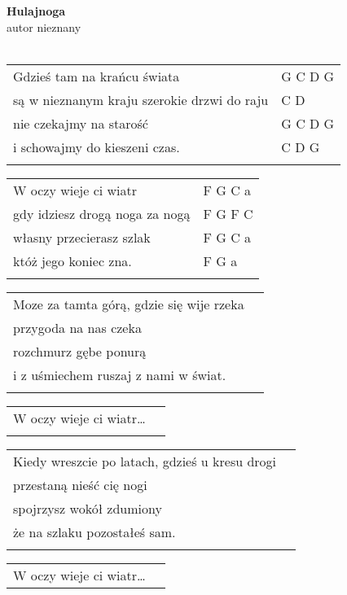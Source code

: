 \documentclass[a5paper]{article}
\begin{document}


\noindent
\fontsize{12pt}{15pt}\selectfont
\textbf{Hulajnoga} \\
\fontsize{8pt}{10pt}\selectfont
autor nieznany \\ \\
\fontsize{10pt}{12pt}\selectfont
{}
\begin{tabular}{@{}p{8.50cm}p{3cm}@{}}
\noindent
Gdzieś tam na krańcu świata & G C D G \\
są w nieznanym kraju szerokie drzwi do raju & C D \\
nie czekajmy na starość & G C D G \\
i schowajmy do kieszeni czas. & C D G \\ \\
\end{tabular}

\noindent
\begin{tabular}{@{}p{7.50cm}p{3cm}@{}}
W oczy wieje ci wiatr & F G C a \\
gdy idziesz drogą noga za nogą & F G F C \\
własny przecierasz szlak & F G C a \\
któż jego koniec zna. & F G a \\ \\
\end{tabular}

\noindent
\begin{tabular}{@{}p{7.50cm}p{3cm}@{}}
Moze za tamta górą, gdzie się wije rzeka \\
przygoda na nas czeka \\
rozchmurz gębe ponurą \\
i z uśmiechem ruszaj z nami w świat. \\ \\
\end{tabular}

\noindent
\begin{tabular}{@{}p{7.50cm}p{3cm}@{}}
W oczy wieje ci wiatr… \\\\
\end{tabular}

\noindent
\begin{tabular}{@{}p{7.50cm}p{3cm}@{}}
Kiedy wreszcie po latach, gdzieś u kresu drogi\\
przestaną nieść cię nogi\\
spojrzysz wokół zdumiony\\
że na szlaku pozostałeś sam.\\\\
\end{tabular}

\noindent
\begin{tabular}{@{}p{7.50cm}p{3cm}@{}}
W oczy wieje ci wiatr…
\end{tabular}
\end{document}
